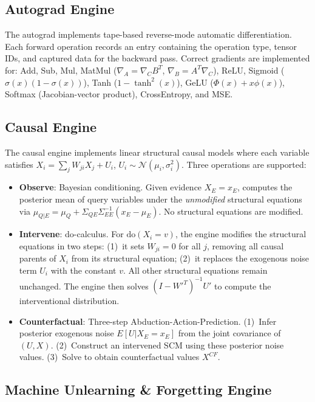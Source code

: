 \documentclass[11pt,a4paper]{article}
\begin{document}
\subsection{Autograd Engine}

The autograd implements tape-based reverse-mode automatic differentiation. Each forward operation records an entry containing the operation type, tensor IDs, and captured data for the backward pass. Correct gradients are implemented for: Add, Sub, Mul, MatMul ($\nabla_A = \nabla_C B^T$, $\nabla_B = A^T \nabla_C$), ReLU, Sigmoid ($\sigma(x)(1-\sigma(x))$), Tanh ($1 - \tanh^2(x)$), GeLU ($\Phi(x) + x\phi(x)$), Softmax (Jacobian-vector product), CrossEntropy, and MSE.

\subsection{Causal Engine}

The causal engine implements linear structural causal models where each variable satisfies $X_i = \sum_j W_{ji} X_j + U_i$, $U_i \sim \mathcal{N}(\mu_i, \sigma_i^2)$. Three operations are supported:

\begin{itemize}[itemsep=2pt]
  \item \textbf{Observe}: Bayesian conditioning. Given evidence $X_E = x_E$, computes the posterior mean of query variables under the \emph{unmodified} structural equations via $\mu_{Q|E} = \mu_Q + \Sigma_{QE}\Sigma_{EE}^{-1}(x_E - \mu_E)$. No structural equations are modified.
  \item \textbf{Intervene}: do-calculus. For $\text{do}(X_i = v)$, the engine modifies the structural equations in two steps: (1)~it sets $W_{ji} = 0$ for all $j$, removing all causal parents of $X_i$ from its structural equation; (2)~it replaces the exogenous noise term $U_i$ with the constant $v$. All other structural equations remain unchanged. The engine then solves $(I - W'^T)^{-1}U'$ to compute the interventional distribution.
  \item \textbf{Counterfactual}: Three-step Abduction-Action-Prediction. (1)~Infer posterior exogenous noise $E[U | X_E = x_E]$ from the joint covariance of $(U, X)$. (2)~Construct an intervened SCM using these posterior noise values. (3)~Solve to obtain counterfactual values $X^{CF}$.
\end{itemize}

\subsection{Machine Unlearning \& Forgetting Engine}
\end{document}
